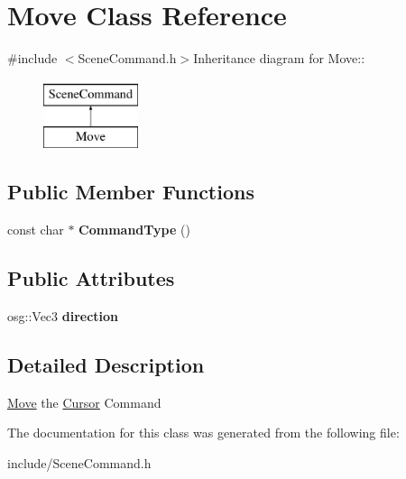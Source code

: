 \hypertarget{class_move}{
\section{Move Class Reference}
\label{class_move}
}


{\ttfamily \#include $<$SceneCommand.h$>$}Inheritance diagram for Move::\begin{figure}[H]
\begin{center}
\leavevmode
\includegraphics[height=2cm]{class_move}
\end{center}
\end{figure}
\subsection*{Public Member Functions}
\begin{DoxyCompactItemize}
\item 
\hypertarget{class_move_a459ec83b0f6ba6a92809d4dd73ec0de4}{
const char $\ast$ {\bfseries CommandType} ()}
\label{class_move_a459ec83b0f6ba6a92809d4dd73ec0de4}

\end{DoxyCompactItemize}
\subsection*{Public Attributes}
\begin{DoxyCompactItemize}
\item 
\hypertarget{class_move_ab142db9cb6c376a1fd5a6bd20669051a}{
osg::Vec3 {\bfseries direction}}
\label{class_move_ab142db9cb6c376a1fd5a6bd20669051a}

\end{DoxyCompactItemize}


\subsection{Detailed Description}
\hyperlink{class_move}{Move} the \hyperlink{class_cursor}{Cursor} Command 

The documentation for this class was generated from the following file:\begin{DoxyCompactItemize}
\item 
include/SceneCommand.h\end{DoxyCompactItemize}
